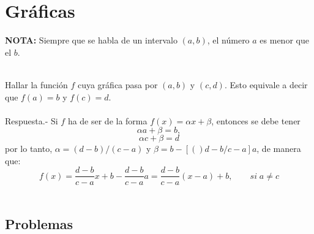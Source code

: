 \chapter{Gráficas}

\textbf{NOTA:} Siempre que se habla de un intervalo $(a,b)$, el número $a$ es menor que el $b.$\\\\

    \begin{ejem}
	Hallar la función $f$ cuya gráfica pasa por $(a,b)$ y $(c,d)$. Esto equivale a decir que $f(a)=b$ y $f(c)=d.$\\\\
	    Respuesta.-\; Si $f$ ha de ser de la forma $f(x)=\alpha x + \beta$, entonces se debe tener $$\alpha a + \beta = b,$$ $$\alpha c + \beta = d$$
	    por lo tanto, $\alpha = (d-b)/(c-a)$ y $\beta = b - \left[()d-b/c-a\right]a$, de manera que:
	    $$f(x)=\dfrac{d-b}{c-a}x + b - \dfrac{d-b}{c-a}a = \dfrac{d-b}{c-a}(x-a) +b, \qquad si \; a\neq c$$\\
     \end{ejem}

\section{Problemas}

